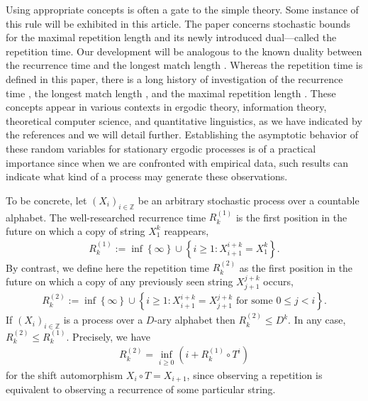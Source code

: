 \documentclass[a4paper,12pt]{article}
\newcommand{\okra}[1]{\left( #1 \right)}
\newcommand{\klam}[1]{\left\{ #1 \right\}}
\begin{document}
Using appropriate concepts is often a gate to the simple theory. Some
instance of this rule will be exhibited in this article. The paper
concerns stochastic bounds for the maximal repetition length and its
newly introduced dual---called the repetition time.  Our development
will be analogous to the known duality between the recurrence time and
the longest match length \citep{WynerZiv89}.  Whereas the repetition
time is defined in this paper, there is a long history of
investigation of the recurrence time
\citep{Kac47,WynerZiv89,OrnsteinWeiss93,Kontoyiannis98,Ko12}, the
longest match length \citep{WynerZiv89,OrnsteinWeiss93,Szpankowski93,
  KontoyiannisOthers98,GaoKontoyiannisBienenstock08}, and the maximal
repetition length
\citep{DeLuca99,KolpakovKucherov99a,KolpakovKucherov99,CrochemoreIlie08,
  ErdosRenyi70,ArratiaWaterman89,Shields92b,Shields97,
  Szpankowski93,Szpankowski93a,KontoyiannisSuhov94,
  Debowski11b,Debowski17,Debowski18b}. These concepts appear in
various contexts in ergodic theory, information theory, theoretical
computer science, and quantitative linguistics, as we have indicated
by the references and we will detail further.  Establishing the
asymptotic behavior of these random variables for stationary ergodic
processes is of a practical importance since when we are confronted
with empirical data, such results can indicate what kind of a process
may generate these observations.

To be concrete, let $(X_i)_{i\in\mathbb{Z}}$ be an arbitrary
stochastic process over a countable alphabet. The well-researched
recurrence time $R^{(1)}_k$ is the first position in the future on
which a copy of string $X_1^k$ reappears,
\begin{align}
  R^{(1)}_k:=\inf\klam{\infty}\cup\klam{i\ge 1: X_{i+1}^{i+k}=X_1^k}.
\end{align}
By contrast, we define here the repetition time $R^{(2)}_k$ as the
first position in the future on which a copy of any previously seen
string $X_{j+1}^{j+k}$ occurs,
\begin{align}
  R^{(2)}_k:=\inf\klam{\infty}\cup\klam{i\ge 1:
  X_{i+1}^{i+k}=X_{j+1}^{j+k}\text{ for some } 0\le j<i}.
\end{align}
If $(X_i)_{i\in\mathbb{Z}}$ is a process over a $D$-ary alphabet then
$R^{(2)}_k\le D^k$. In any case, $R^{(2)}_k\le R^{(1)}_k$. Precisely,
we have
\begin{align}
  \label{Minimum}
  R^{(2)}_k=\inf_{i\ge 0}\okra{i+R^{(1)}_k\circ T^i}
\end{align}
for the shift automorphism $X_i\circ T=X_{i+1}$, since observing a
repetition is equivalent to observing a recurrence of some particular
string.
\end{document}
